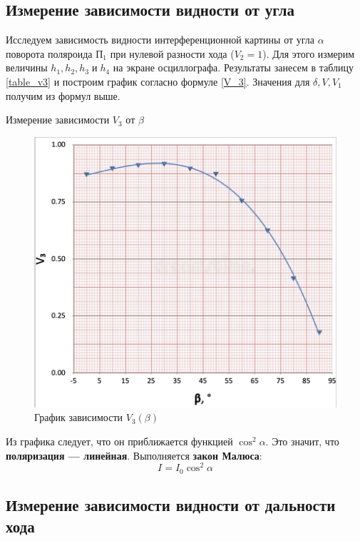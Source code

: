 \documentclass[12pt,a4paper]{article}
\begin{document}
    \subsection*{Измерение зависимости видности от угла}
    
    Исследуем зависимость видности интерференционной картины от угла
    $ \alpha $ поворота поляроида $ \text{П}_1 $ при нулевой разности хода ($ V_2 = 1 $). Для этого измерим величины $ h_1, h_2, h_3 \; \text{и} \; h_4 $ на экране осциллографа. Результаты занесем в таблицу \ref{table_v3} и построим график согласно формуле \eqref{V_3}. Значения для $ \delta, V, V_1 $ получим из формул выше.

     \begin{table}[h!]
       \centering
       \footnotesize
       
       \caption{Измерение зависимости $V_3$ от $\beta$}
       \label{table_v2}
    \end{table}	


    \begin{figure}[h!]
        \centering
        \includegraphics[width=0.8\linewidth]{src/v3b.png}
        \caption{График зависимости $V_3 (\beta)$}
    \end{figure}

    Из графика следует, что он приближается функцией $ \cos^2 \alpha $. Это значит, что \textbf{поляризация --- линейная}. Выполняется \textbf{закон Малюса}:
    \[ I = I_0 \cos^2\alpha \]

    \subsection*{Измерение зависимости видности от дальности хода}
\end{document}
